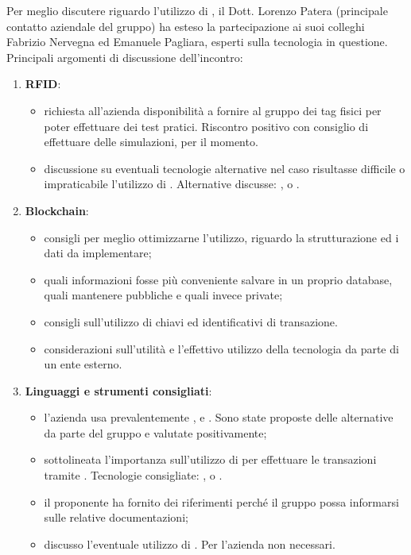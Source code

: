 Per meglio discutere riguardo l'utilizzo di ,  il Dott. Lorenzo Patera (principale contatto aziendale del gruppo) ha esteso la partecipazione ai suoi colleghi Fabrizio Nervegna ed Emanuele Pagliara, esperti sulla tecnologia in questione.
Principali argomenti di discussione dell'incontro:
\begin{enumerate}
    \item \textbf{RFID}:
        \begin{itemize}
            \item richiesta all'azienda disponibilità a fornire al gruppo dei tag fisici per poter effettuare dei test pratici. Riscontro positivo con consiglio di effettuare delle simulazioni, per il momento.
            \item discussione su eventuali tecnologie alternative nel caso risultasse difficile o impraticabile l'utilizzo di . Alternative discusse: ,  o .
        \end{itemize}
    \item \textbf{Blockchain}:
        \begin{itemize}
            \item consigli per meglio ottimizzarne l'utilizzo, riguardo la strutturazione ed i dati da implementare;
            \item quali informazioni fosse più conveniente salvare in un proprio database, quali mantenere pubbliche e quali invece private; 
            \item consigli sull'utilizzo di chiavi  ed identificativi di transazione.
            \item considerazioni sull'utilità e l'effettivo utilizzo della tecnologia da parte di un ente esterno.
        \end{itemize}
    \item \textbf{Linguaggi e strumenti consigliati}:\\
        \begin{itemize}
            \item l'azienda usa prevalentemente ,  e . Sono state proposte delle alternative da parte del gruppo e valutate positivamente;
            \item sottolineata l'importanza sull'utilizzo di  per effettuare le transazioni tramite . Tecnologie consigliate: ,  o .
            \item il proponente ha fornito dei riferimenti perché il gruppo possa informarsi sulle relative documentazioni;
            \item discusso l'eventuale utilizzo di . Per l'azienda non necessari.
        \end{itemize}
\end{enumerate}